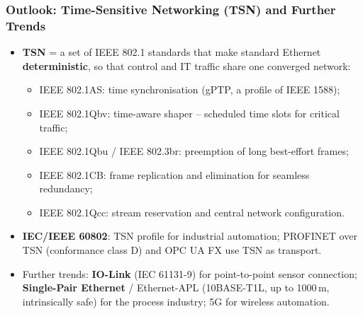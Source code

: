 \begin{frame}
	\frametitle{Outlook: Time-Sensitive Networking (TSN) and Further Trends}
	\small
	\begin{itemize}
		\item \textbf{TSN} = a set of IEEE 802.1 standards that make standard Ethernet \textbf{deterministic}, so that control and IT traffic share one converged network:
		\begin{itemize}
			\item IEEE 802.1AS: time synchronisation (gPTP, a profile of IEEE 1588);
			\item IEEE 802.1Qbv: time-aware shaper -- scheduled time slots for critical traffic;
			\item IEEE 802.1Qbu / IEEE 802.3br: preemption of long best-effort frames;
			\item IEEE 802.1CB: frame replication and elimination for seamless redundancy;
			\item IEEE 802.1Qcc: stream reservation and central network configuration.
		\end{itemize}
		\item \textbf{IEC/IEEE 60802}: TSN profile for industrial automation; PROFINET over TSN (conformance class D) and OPC UA FX use TSN as transport.
		\item Further trends: \textbf{IO-Link} (IEC 61131-9) for point-to-point sensor connection; \textbf{Single-Pair Ethernet} / Ethernet-APL (10BASE-T1L, up to 1000\,m, intrinsically safe) for the process industry; 5G for wireless automation.
	\end{itemize}
\end{frame}

